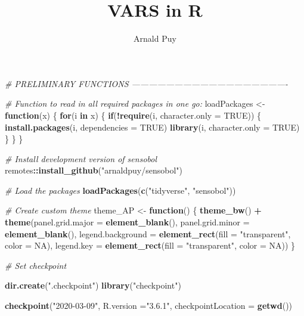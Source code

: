 \documentclass[11pt,]{article}
\title{VARS in R}
\author{Arnald Puy}
\date{}
\newenvironment{Shaded}{\begin{snugshade}}{\end{snugshade}}
\newcommand{\CommentTok}[1]{\textcolor[rgb]{0.56,0.35,0.01}{\textit{#1}}}
\newcommand{\ControlFlowTok}[1]{\textcolor[rgb]{0.13,0.29,0.53}{\textbf{#1}}}
\newcommand{\DataTypeTok}[1]{\textcolor[rgb]{0.13,0.29,0.53}{#1}}
\newcommand{\KeywordTok}[1]{\textcolor[rgb]{0.13,0.29,0.53}{\textbf{#1}}}
\newcommand{\NormalTok}[1]{#1}
\newcommand{\OperatorTok}[1]{\textcolor[rgb]{0.81,0.36,0.00}{\textbf{#1}}}
\newcommand{\OtherTok}[1]{\textcolor[rgb]{0.56,0.35,0.01}{#1}}
\newcommand{\StringTok}[1]{\textcolor[rgb]{0.31,0.60,0.02}{#1}}
\begin{document}
\maketitle

\newpage

\begin{Shaded}
\begin{Highlighting}[]
\CommentTok{# PRELIMINARY FUNCTIONS -------------------------------------------------------}

\CommentTok{# Function to read in all required packages in one go:}
\NormalTok{loadPackages <-}\StringTok{ }\ControlFlowTok{function}\NormalTok{(x) \{}
  \ControlFlowTok{for}\NormalTok{(i }\ControlFlowTok{in}\NormalTok{ x) \{}
    \ControlFlowTok{if}\NormalTok{(}\OperatorTok{!}\KeywordTok{require}\NormalTok{(i, }\DataTypeTok{character.only =} \OtherTok{TRUE}\NormalTok{)) \{}
      \KeywordTok{install.packages}\NormalTok{(i, }\DataTypeTok{dependencies =} \OtherTok{TRUE}\NormalTok{)}
      \KeywordTok{library}\NormalTok{(i, }\DataTypeTok{character.only =} \OtherTok{TRUE}\NormalTok{)}
\NormalTok{    \}}
\NormalTok{  \}}
\NormalTok{\}}

\CommentTok{# Install development version of sensobol}
\NormalTok{remotes}\OperatorTok{::}\KeywordTok{install_github}\NormalTok{(}\StringTok{"arnaldpuy/sensobol"}\NormalTok{)}

\CommentTok{# Load the packages}
\KeywordTok{loadPackages}\NormalTok{(}\KeywordTok{c}\NormalTok{(}\StringTok{"tidyverse"}\NormalTok{, }\StringTok{"sensobol"}\NormalTok{))}



\CommentTok{# Create custom theme}
\NormalTok{theme_AP <-}\StringTok{ }\ControlFlowTok{function}\NormalTok{() \{}
  \KeywordTok{theme_bw}\NormalTok{() }\OperatorTok{+}
\StringTok{    }\KeywordTok{theme}\NormalTok{(}\DataTypeTok{panel.grid.major =} \KeywordTok{element_blank}\NormalTok{(),}
          \DataTypeTok{panel.grid.minor =} \KeywordTok{element_blank}\NormalTok{(),}
          \DataTypeTok{legend.background =} \KeywordTok{element_rect}\NormalTok{(}\DataTypeTok{fill =} \StringTok{"transparent"}\NormalTok{,}
                                           \DataTypeTok{color =} \OtherTok{NA}\NormalTok{),}
          \DataTypeTok{legend.key =} \KeywordTok{element_rect}\NormalTok{(}\DataTypeTok{fill =} \StringTok{"transparent"}\NormalTok{,}
                                    \DataTypeTok{color =} \OtherTok{NA}\NormalTok{))}
\NormalTok{\}}

\CommentTok{# Set checkpoint}

\KeywordTok{dir.create}\NormalTok{(}\StringTok{".checkpoint"}\NormalTok{)}
\KeywordTok{library}\NormalTok{(}\StringTok{"checkpoint"}\NormalTok{)}

\KeywordTok{checkpoint}\NormalTok{(}\StringTok{"2020-03-09"}\NormalTok{, }
           \DataTypeTok{R.version =}\StringTok{"3.6.1"}\NormalTok{, }
           \DataTypeTok{checkpointLocation =} \KeywordTok{getwd}\NormalTok{())}
\end{Highlighting}
\end{Shaded}
\end{document}

